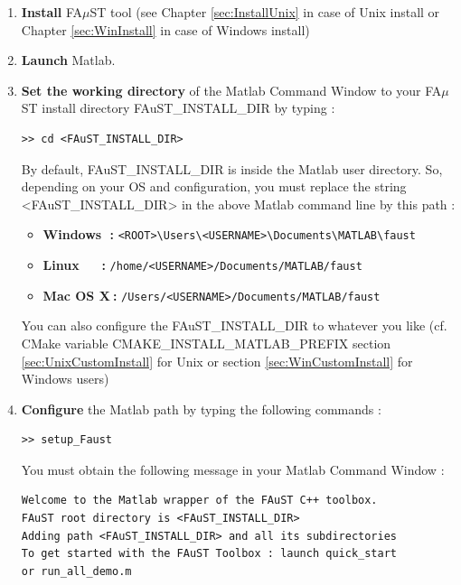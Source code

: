 \begin{enumerate}
	\item \textbf{Install} FA$\mu$ST tool (see Chapter \ref{sec:InstallUnix} in case of Unix install or Chapter \ref{sec:WinInstall} in case of Windows install)
	\item \textbf{Launch} Matlab.
	\item \textbf{Set the working directory} of the Matlab Command Window to your FA$\mu$ST install directory FAuST\_INSTALL\_DIR by typing :
		      	\begin{lstlisting}[style=customMatlab]
>> cd <FAuST_INSTALL_DIR>\end{lstlisting}	
	By default, FAuST\_INSTALL\_DIR is inside the Matlab user directory. So, depending on your OS and configuration, you must replace the string <FAuST\_INSTALL\_DIR> in the above Matlab command line by this path :
		\begin{itemize} 
			\item \textbf{Windows$\ \ \ $:} \texttt{<ROOT>\textbackslash Users\textbackslash <USERNAME>\textbackslash Documents\textbackslash MATLAB\textbackslash faust}
			\item \textbf{Linux$\ \ \ \ \ \ \ \ $:} \texttt{/home/<USERNAME>/Documents/MATLAB/faust}
			\item \textbf{Mac OS X$\ $:} \texttt{/Users/<USERNAME>/Documents/MATLAB/faust}
		\end{itemize}
	You can also configure the FAuST\_INSTALL\_DIR to whatever you like (cf. CMake variable CMAKE\_INSTALL\_MATLAB\_PREFIX section 		\ref{sec:UnixCustomInstall} for Unix or section \ref{sec:WinCustomInstall} for Windows users)
	



	\item \textbf{Configure} the Matlab path by typing the following commands :
	\lstset{style=customMatlab}
	\begin{lstlisting}
>> setup_Faust \end{lstlisting}
	You must obtain the following message in your Matlab Command Window : 
	\begin{lstlisting}
Welcome to the Matlab wrapper of the FAuST C++ toolbox. 
FAuST root directory is <FAuST_INSTALL_DIR>
Adding path <FAuST_INSTALL_DIR> and all its subdirectories 
To get started with the FAuST Toolbox : launch quick_start 
or run_all_demo.m \end{lstlisting}

\end{enumerate}




